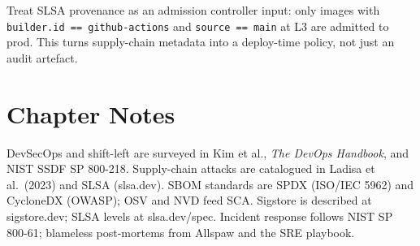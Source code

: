 \begin{remark}
Treat SLSA provenance as an admission controller input: only images with \texttt{builder.id == github-actions} and \texttt{source == main} at L3 are admitted to prod. This turns supply-chain metadata into a deploy-time policy, not just an audit artefact.
\end{remark}

\section*{Chapter Notes}
DevSecOps and shift-left are surveyed in Kim et al., \emph{The DevOps Handbook}, and NIST SSDF SP 800-218. Supply-chain attacks are catalogued in Ladisa et al.\ (2023) and SLSA (slsa.dev). SBOM standards are SPDX (ISO/IEC 5962) and CycloneDX (OWASP); OSV and NVD feed SCA. Sigstore is described at sigstore.dev; SLSA levels at slsa.dev/spec. Incident response follows NIST SP 800-61; blameless post-mortems from Allspaw and the SRE playbook.

